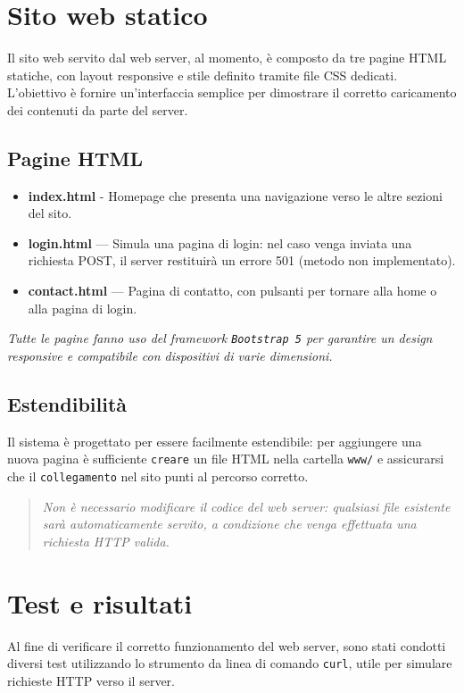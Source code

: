 \documentclass[a4paper,12pt]{report}
\begin{document}
\chapter{Sito web statico}
Il sito web servito dal web server, al momento, è composto da tre pagine HTML statiche, con layout responsive e stile definito
tramite file CSS dedicati. L'obiettivo è fornire un'interfaccia semplice per dimostrare il corretto caricamento dei contenuti
da parte del server.

\section{Pagine HTML}

\begin{itemize}
    \item \textbf{index.html} - Homepage che presenta una navigazione verso le altre sezioni del sito.
    \item \textbf{login.html} — Simula una pagina di login: nel caso venga inviata una richiesta POST, il server restituirà un errore 501 (metodo non implementato).
    \item \textbf{contact.html} — Pagina di contatto, con pulsanti per tornare alla home o alla pagina di login.
\end{itemize}
%
\textit{Tutte le pagine fanno uso del framework \texttt{Bootstrap 5} per garantire un design responsive e compatibile con dispositivi di varie dimensioni.}

\section{Estendibilità}

Il sistema è progettato per essere facilmente estendibile: per aggiungere una nuova pagina è sufficiente \texttt{creare} un file HTML nella cartella
\texttt{www/} e assicurarsi che il \texttt{collegamento} nel sito punti al percorso corretto.

\begin{quote}
    \textit{Non è necessario modificare il codice del web server: qualsiasi file esistente sarà automaticamente servito, a condizione che venga effettuata una richiesta HTTP valida.}
\end{quote}


\chapter{Test e risultati}
Al fine di verificare il corretto funzionamento del web server, sono stati condotti diversi test utilizzando lo strumento da linea di comando \texttt{curl}, utile per simulare
richieste HTTP verso il server.
\end{document}
